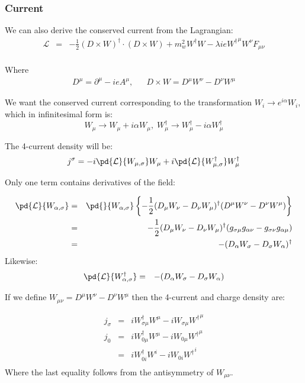 \subsubsection{Current}

We can also derive the conserved current from the Lagrangian:
\begin{eqnarray*}
\mathcal{L} 
	&=&	-\frac{1}{2} (D \times W)^\dagger \cdot (D \times W) 
				+ m_w^2 W^\dagger W 
				-\lambda i e {W^\dagger}^\mu W^\nu F_{\mu \nu}	\\
\end{eqnarray*}

Where
\begin{eqnarray*}
		D^\mu	=	\partial^\mu - i e A^\mu ,
	&&
		D \times W = D^\mu W^\nu - D^\nu W^\mu
\end{eqnarray*}


We want the conserved current corresponding to the transformation $ W_i \to e^{i \alpha}W_i $, which in infinitesimal form is:
\begin{equation*}
	W_\mu \to W_\mu + i \alpha W_\mu, \;
	W_\mu^\dagger \to W_\mu^\dagger - i \alpha W_\mu^{\dagger}
\end{equation*}

The 4-current density will be:
\begin{equation*}
j^{\sigma} = -i \pd {\mathcal{L} }{W_{\mu, \sigma}} W_\mu  +  i\pd {\mathcal{L} }{W^\dagger_{\mu, \sigma}} W^\dagger_\mu
\end{equation*}

Only one term contains derivatives of the field:

\begin{eqnarray*}
 \pd {\mathcal{L} }{W_{\alpha, \sigma}} 
		&=& \pd{}{W_{\alpha, \sigma}} \left \{ - \frac{1}{2} (D_\mu W_\nu - D_\nu W_\mu)^\dagger(D^\mu W^\nu - D^\nu W^\mu) \right \}\\
		&=& - \frac{1}{2} (D_\mu W_\nu - D_\nu W_\mu)^\dagger (g_{\sigma \mu} g_{\alpha \nu} - g_{\sigma \nu}g_{\alpha \mu})\\
		&=& - (D_\alpha W_\sigma - D_\sigma W_\alpha)^\dagger
\end{eqnarray*}
Likewise:
\begin{eqnarray*}
	\pd {\mathcal{L} }{W_{\alpha, \sigma}^\dagger} 
		&=& - (D_\alpha W_\sigma - D_\sigma W_\alpha)
\end{eqnarray*}

If  we define $W_{\mu \nu} =  D^\mu W^\nu - D^\nu W^\mu$ then the 4-current and charge density are:

\begin{eqnarray*}
	j_\sigma &=& i W_{\sigma \mu}^\dagger W^{\mu} - i W_{\sigma \mu} {W^{\dagger}}^\mu \\
	j_0 	&=& i W_{0 \mu}^\dagger W^{\mu} - i W_{0 \mu} {W^{\dagger}}^\mu \\
		&=& i W_{0 i}^\dagger W^i - i W_{0 i} {W^{\dagger}}^i \\
\end{eqnarray*}
Where the last equality follows from the antisymmetry of $W_{\mu \nu}$.

